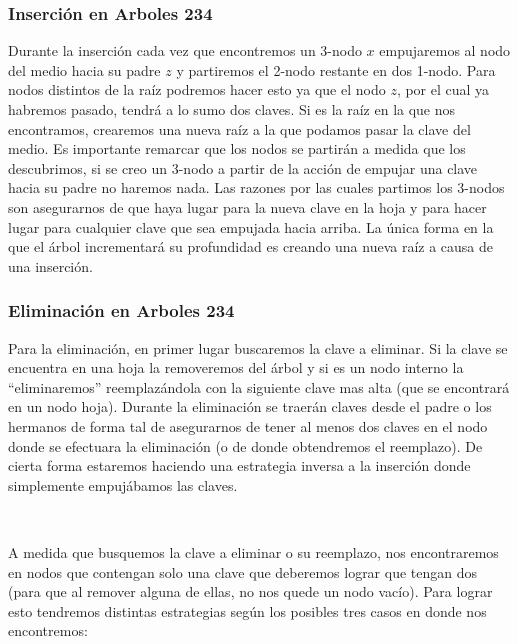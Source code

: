 \subsubsection{Inserci\'on en Arboles 234}

Durante la inserci\'on cada vez que encontremos un 3-nodo $x$ empujaremos al nodo del medio hacia su padre $z$ y partiremos el 2-nodo restante en dos 1-nodo. Para nodos distintos de la ra\'iz podremos hacer esto ya que el nodo $z$, por el cual ya habremos pasado, tendr\'a a lo sumo dos claves.  Si es la ra\'iz en la que nos encontramos, crearemos una nueva ra\'iz a la que podamos pasar la clave del medio. Es importante remarcar que los nodos se partir\'an a medida que los descubrimos, si se creo un 3-nodo a partir de la acci\'on de empujar una clave hacia su padre no haremos nada. Las razones por las cuales partimos los 3-nodos son asegurarnos de que haya lugar para la nueva clave en la hoja y para hacer lugar para cualquier clave que sea empujada hacia arriba. La \'unica forma en la que el \'arbol incrementar\'a su profundidad es creando una nueva ra\'iz a causa de una inserci\'on.

\subsubsection{Eliminaci\'on en Arboles 234}

Para la eliminaci\'on, en primer lugar buscaremos la clave a eliminar. Si la clave se encuentra en una hoja la removeremos del \'arbol y si es un nodo interno la ``eliminaremos'' reemplaz\'andola con la siguiente clave mas alta (que se encontrar\'a en un nodo hoja).
Durante la eliminaci\'on se traer\'an claves desde el padre o los hermanos de forma tal de asegurarnos de tener al menos  dos claves en el nodo donde se efectuara la eliminaci\'on (o de donde obtendremos el reemplazo).
De cierta forma estaremos haciendo una estrategia inversa a la inserci\'on donde simplemente empuj\'abamos las claves.

~

A medida que busquemos la clave a eliminar o su reemplazo, nos encontraremos en nodos que contengan solo una clave que deberemos lograr que tengan dos (para que al remover alguna de ellas, no nos quede un nodo vac\'io). Para lograr esto tendremos distintas estrategias seg\'un los posibles tres casos en donde nos encontremos:

